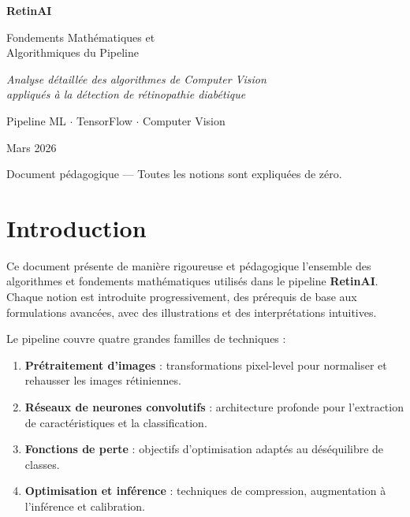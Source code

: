 \documentclass[11pt,a4paper]{article}
\begin{document}
\begin{titlepage}
\centering
\vspace*{3cm}
{\Huge\bfseries\color{accent} RetinAI\par}
\vspace{0.8cm}
{\LARGE Fondements Mathématiques et\\Algorithmiques du Pipeline\par}
\vspace{1.5cm}
{\large\textit{Analyse détaillée des algorithmes de Computer Vision\\appliqués à la détection de rétinopathie diabétique}\par}
\vspace{3cm}
{\large Pipeline ML $\cdot$ TensorFlow $\cdot$ Computer Vision\par}
\vspace{1cm}
{\normalsize Mars 2026\par}
\vfill
{\small Document pédagogique --- Toutes les notions sont expliquées de zéro.}
\end{titlepage}

\tableofcontents
\newpage

\section{Introduction}

Ce document présente de manière rigoureuse et pédagogique l'ensemble des algorithmes et fondements mathématiques utilisés dans le pipeline \textbf{RetinAI}. Chaque notion est introduite progressivement, des prérequis de base aux formulations avancées, avec des illustrations et des interprétations intuitives.

Le pipeline couvre quatre grandes familles de techniques :

\begin{enumerate}[leftmargin=2em]
  \item \textbf{Prétraitement d'images} : transformations pixel-level pour normaliser et rehausser les images rétiniennes.
  \item \textbf{Réseaux de neurones convolutifs} : architecture profonde pour l'extraction de caractéristiques et la classification.
  \item \textbf{Fonctions de perte} : objectifs d'optimisation adaptés au déséquilibre de classes.
  \item \textbf{Optimisation et inférence} : techniques de compression, augmentation à l'inférence et calibration.
\end{enumerate}
\end{document}
